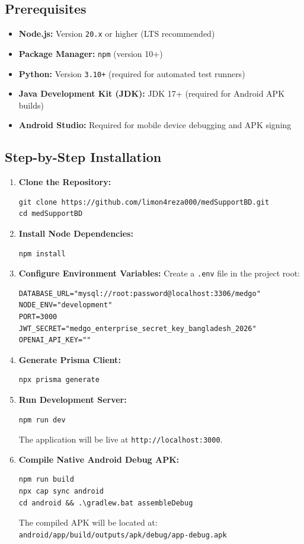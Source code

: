 \documentclass[10pt,a4paper]{article}
\begin{document}
\subsection{Prerequisites}
\begin{itemize}[leftmargin=*]
    \item \textbf{Node.js:} Version \texttt{20.x} or higher (LTS recommended)
    \item \textbf{Package Manager:} \texttt{npm} (version 10+)
    \item \textbf{Python:} Version \texttt{3.10+} (required for automated test runners)
    \item \textbf{Java Development Kit (JDK):} JDK 17+ (required for Android APK builds)
    \item \textbf{Android Studio:} Required for mobile device debugging and APK signing
\end{itemize}

\subsection{Step-by-Step Installation}
\begin{enumerate}[leftmargin=*]
    \item \textbf{Clone the Repository:}
\begin{verbatim}
git clone https://github.com/limon4reza000/medSupportBD.git
cd medSupportBD
\end{verbatim}
    \item \textbf{Install Node Dependencies:}
\begin{verbatim}
npm install
\end{verbatim}
    \item \textbf{Configure Environment Variables:} Create a \texttt{.env} file in the project root:
\begin{verbatim}
DATABASE_URL="mysql://root:password@localhost:3306/medgo"
NODE_ENV="development"
PORT=3000
JWT_SECRET="medgo_enterprise_secret_key_bangladesh_2026"
OPENAI_API_KEY=""
\end{verbatim}
    \item \textbf{Generate Prisma Client:}
\begin{verbatim}
npx prisma generate
\end{verbatim}
    \item \textbf{Run Development Server:}
\begin{verbatim}
npm run dev
\end{verbatim}
    The application will be live at \texttt{http://localhost:3000}.
    \item \textbf{Compile Native Android Debug APK:}
\begin{verbatim}
npm run build
npx cap sync android
cd android && .\gradlew.bat assembleDebug
\end{verbatim}
    The compiled APK will be located at:
    \texttt{android/app/build/outputs/apk/debug/app-debug.apk}
\end{enumerate}
\end{document}

